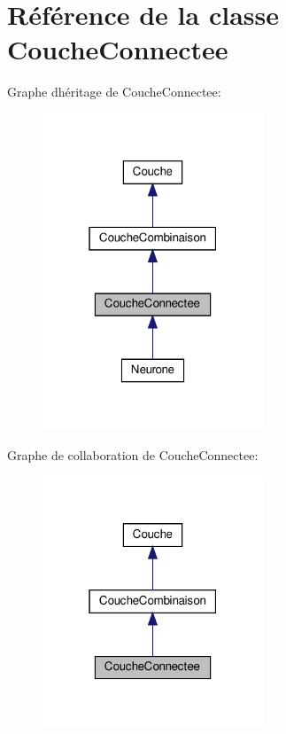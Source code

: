 \hypertarget{class_couche_connectee}{}\section{Référence de la classe Couche\+Connectee}
\label{class_couche_connectee}


Graphe d\textquotesingle{}héritage de Couche\+Connectee\+:\nopagebreak
\begin{figure}[H]
\begin{center}
\leavevmode
\includegraphics[width=187pt]{class_couche_connectee__inherit__graph}
\end{center}
\end{figure}


Graphe de collaboration de Couche\+Connectee\+:\nopagebreak
\begin{figure}[H]
\begin{center}
\leavevmode
\includegraphics[width=187pt]{class_couche_connectee__coll__graph}
\end{center}
\end{figure}
